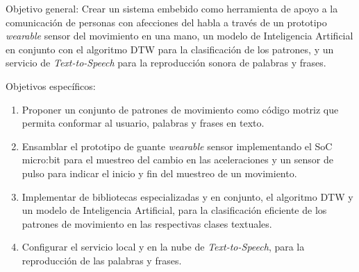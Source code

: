 \hfill\break 
Objetivo general: \hfill\break
Crear un sistema embebido como herramienta de apoyo a la comunicación de personas con afecciones del habla a través de un prototipo \textit{wearable} sensor del movimiento en una mano, un modelo de Inteligencia Artificial en conjunto con el algoritmo DTW para la clasificación de los patrones, y un servicio de \textit{Text-to-Speech} para la reproducción sonora de palabras y frases.

\hfill\break
Objetivos específicos:	
\begin{enumerate}

	\item \justifying Proponer un conjunto de patrones de movimiento como código motriz que permita conformar al usuario, palabras y frases en texto.
	
	\item \justifying Ensamblar el prototipo de guante \textit{wearable} sensor implementando el SoC micro:bit para el muestreo del cambio en las aceleraciones y un sensor de pulso para indicar el inicio y fin del muestreo de un movimiento.

	\item \justifying Implementar de bibliotecas especializadas y en conjunto, el algoritmo DTW y un modelo de Inteligencia Artificial, para la clasificación eficiente de los patrones de movimiento en las respectivas clases textuales.
	
	\item \justifying Configurar el servicio local y en la nube de \textit{Text-to-Speech}, para la reproducción de las palabras y frases.
\end{enumerate}